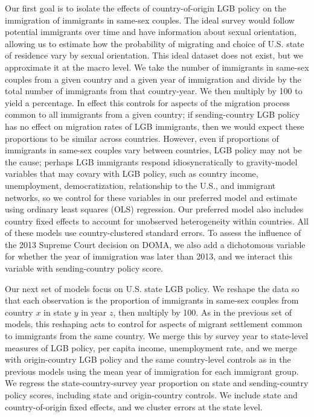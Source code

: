 \documentclass[
  11pt,
]{article}
\begin{document}
Our first goal is to isolate the effects of country-of-origin LGB policy on the immigration of immigrants in same-sex couples. The ideal survey would follow potential immigrants over time and have information about sexual orientation, allowing us to estimate how the probability of migrating and choice of U.S. state of residence vary by sexual orientation. This ideal dataset does not exist, but we approximate it at the macro level. We take the number of immigrants in same-sex couples from a given country and a given year of immigration and divide by the total number of immigrants from that country-year. We then multiply by 100 to yield a percentage. In effect this controls for aspects of the migration process common to all immigrants from a given country; if sending-country LGB policy has no effect on migration rates of LGB immigrants, then we would expect these proportions to be similar across countries. However, even if proportions of immigrants in same-sex couples vary between countries, LGB policy may not be the cause; perhaps LGB immigrants respond idiosyncratically to gravity-model variables that may covary with LGB policy, such as country income, unemployment, democratization, relationship to the U.S., and immigrant networks, so we control for these variables in our preferred model and estimate using ordinary least squares (OLS) regression. Our preferred model also includes country fixed effects to account for unobserved heterogeneity within countries. All of these models use country-clustered standard errors. To assess the influence of the 2013 Supreme Court decision on DOMA, we also add a dichotomous variable for whether the year of immigration was later than 2013, and we interact this variable with sending-country policy score.

Our next set of models focus on U.S. state LGB policy. We reshape the data so that each observation is the proportion of immigrants in same-sex couples from country \(x\) in state \(y\) in year \(z\), then multiply by 100. As in the previous set of models, this reshaping acts to control for aspects of migrant settlement common to immigrants from the same country. We merge this by survey year to state-level measures of LGB policy, per capita income, unemployment rate, and we merge with origin-country LGB policy and the same country-level controls as in the previous models using the mean year of immigration for each immigrant group. We regress the state-country-survey year proportion on state and sending-country policy scores, including state and origin-country controls. We include state and country-of-origin fixed effects, and we cluster errors at the state level.
\end{document}

